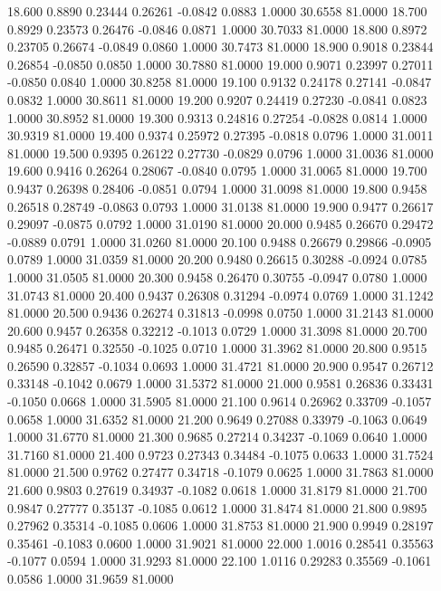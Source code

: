   18.600   0.8890   0.23444   0.26261  -0.0842   0.0883   1.0000  30.6558  81.0000
  18.700   0.8929   0.23573   0.26476  -0.0846   0.0871   1.0000  30.7033  81.0000
  18.800   0.8972   0.23705   0.26674  -0.0849   0.0860   1.0000  30.7473  81.0000
  18.900   0.9018   0.23844   0.26854  -0.0850   0.0850   1.0000  30.7880  81.0000
  19.000   0.9071   0.23997   0.27011  -0.0850   0.0840   1.0000  30.8258  81.0000
  19.100   0.9132   0.24178   0.27141  -0.0847   0.0832   1.0000  30.8611  81.0000
  19.200   0.9207   0.24419   0.27230  -0.0841   0.0823   1.0000  30.8952  81.0000
  19.300   0.9313   0.24816   0.27254  -0.0828   0.0814   1.0000  30.9319  81.0000
  19.400   0.9374   0.25972   0.27395  -0.0818   0.0796   1.0000  31.0011  81.0000
  19.500   0.9395   0.26122   0.27730  -0.0829   0.0796   1.0000  31.0036  81.0000
  19.600   0.9416   0.26264   0.28067  -0.0840   0.0795   1.0000  31.0065  81.0000
  19.700   0.9437   0.26398   0.28406  -0.0851   0.0794   1.0000  31.0098  81.0000
  19.800   0.9458   0.26518   0.28749  -0.0863   0.0793   1.0000  31.0138  81.0000
  19.900   0.9477   0.26617   0.29097  -0.0875   0.0792   1.0000  31.0190  81.0000
  20.000   0.9485   0.26670   0.29472  -0.0889   0.0791   1.0000  31.0260  81.0000
  20.100   0.9488   0.26679   0.29866  -0.0905   0.0789   1.0000  31.0359  81.0000
  20.200   0.9480   0.26615   0.30288  -0.0924   0.0785   1.0000  31.0505  81.0000
  20.300   0.9458   0.26470   0.30755  -0.0947   0.0780   1.0000  31.0743  81.0000
  20.400   0.9437   0.26308   0.31294  -0.0974   0.0769   1.0000  31.1242  81.0000
  20.500   0.9436   0.26274   0.31813  -0.0998   0.0750   1.0000  31.2143  81.0000
  20.600   0.9457   0.26358   0.32212  -0.1013   0.0729   1.0000  31.3098  81.0000
  20.700   0.9485   0.26471   0.32550  -0.1025   0.0710   1.0000  31.3962  81.0000
  20.800   0.9515   0.26590   0.32857  -0.1034   0.0693   1.0000  31.4721  81.0000
  20.900   0.9547   0.26712   0.33148  -0.1042   0.0679   1.0000  31.5372  81.0000
  21.000   0.9581   0.26836   0.33431  -0.1050   0.0668   1.0000  31.5905  81.0000
  21.100   0.9614   0.26962   0.33709  -0.1057   0.0658   1.0000  31.6352  81.0000
  21.200   0.9649   0.27088   0.33979  -0.1063   0.0649   1.0000  31.6770  81.0000
  21.300   0.9685   0.27214   0.34237  -0.1069   0.0640   1.0000  31.7160  81.0000
  21.400   0.9723   0.27343   0.34484  -0.1075   0.0633   1.0000  31.7524  81.0000
  21.500   0.9762   0.27477   0.34718  -0.1079   0.0625   1.0000  31.7863  81.0000
  21.600   0.9803   0.27619   0.34937  -0.1082   0.0618   1.0000  31.8179  81.0000
  21.700   0.9847   0.27777   0.35137  -0.1085   0.0612   1.0000  31.8474  81.0000
  21.800   0.9895   0.27962   0.35314  -0.1085   0.0606   1.0000  31.8753  81.0000
  21.900   0.9949   0.28197   0.35461  -0.1083   0.0600   1.0000  31.9021  81.0000
  22.000   1.0016   0.28541   0.35563  -0.1077   0.0594   1.0000  31.9293  81.0000
  22.100   1.0116   0.29283   0.35569  -0.1061   0.0586   1.0000  31.9659  81.0000
